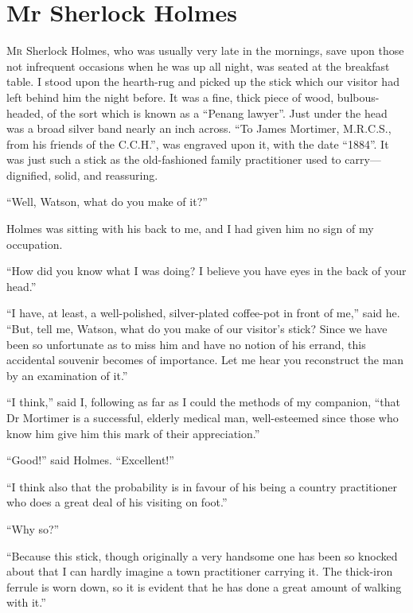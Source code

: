 \documentclass[paper=5.5in:8.5in,BCOR=7mm,twoside,DIV=calc,12pt,usegeometry,openany,chapterprefix,endperiod,headings=big]{scrbook} %
\begin{document}
\chapter{Mr Sherlock Holmes}
\lettrine[lines=1]{M}{r} Sherlock Holmes, who was usually very late in the mornings, save upon those not infrequent occasions when he was up all night, was seated at the breakfast table. I stood upon the hearth-rug and picked up the stick which our visitor had left behind him the night before. It was a fine, thick piece of wood, bulbous-headed, of the sort which is known as a \enquote{Penang lawyer}. Just under the head was a broad silver band nearly an inch across. \enquote{To James Mortimer, M.R.C.S., from his friends of the C.C.H.}, was engraved upon it, with the date \enquote{1884}. It was just such a stick as the old-fashioned family practitioner used to carry---dignified, solid, and reassuring.

\enquote{Well, Watson, what do you make of it?}

Holmes was sitting with his back to me, and I had given him no sign of my occupation.

\enquote{How did you know what I was doing? I believe you have eyes in the back of your head.}

\enquote{I have, at least, a well-polished, silver-plated coffee-pot in front of me,} said he. \enquote{But, tell me, Watson, what do you make of our visitor's stick? Since we have been so unfortunate as to miss him and have no notion of his errand, this accidental souvenir becomes of importance. Let me hear you reconstruct the man by an examination of it.}

\enquote{I think,} said I, following as far as I could the methods of my companion, \enquote{that Dr Mortimer is a successful, elderly medical man, well-esteemed since those who know him give him this mark of their appreciation.}

\enquote{Good!} said Holmes. \enquote{Excellent!}

\enquote{I think also that the probability is in favour of his being a country practitioner who does a great deal of his visiting on foot.}

\enquote{Why so?}

\enquote{Because this stick, though originally a very handsome one has been so knocked about that I can hardly imagine a town practitioner carrying it. The thick-iron ferrule is worn down, so it is evident that he has done a great amount of walking with it.}
\end{document}
